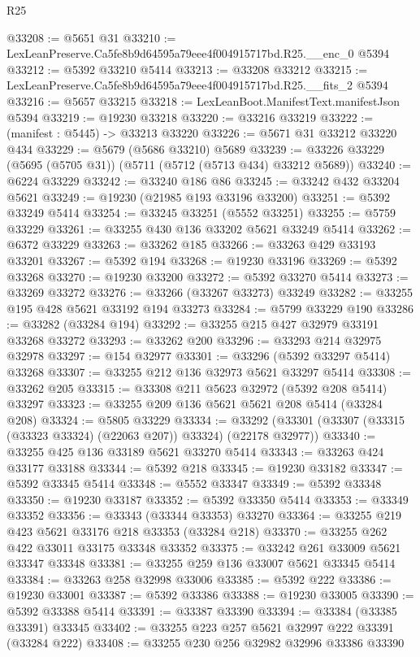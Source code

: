 \begin{lexlean}{R25}
\begin{coremodule}
@33208 := @5651 @31
@33210 := LexLeanPreserve.Ca5fe8b9d64595a79eee4f004915717bd.R25.__enc_0 @5394
@33212 := @5392 @33210 @5414
@33213 := @33208 @33212
@33215 := LexLeanPreserve.Ca5fe8b9d64595a79eee4f004915717bd.R25.__fits_2 @5394
@33216 := @5657 @33215
@33218 := LexLeanBoot.ManifestText.manifestJson @5394
@33219 := @19230 @33218
@33220 := @33216 @33219
@33222 := (manifest : @5445) -> @33213 @33220
@33226 := @5671 @31 @33212 @33220 @434
@33229 := @5679 (@5686 @33210) @5689
@33239 := @33226 @33229 (@5695 (@5705 @31)) (@5711 (@5712 (@5713 @434) @33212 @5689))
@33240 := @6224 @33229
@33242 := @33240 @186 @86
@33245 := @33242 @432 @33204 @5621
@33249 := @19230 (@21985 @193 @33196 @33200)
@33251 := @5392 @33249 @5414
@33254 := @33245 @33251 (@5552 @33251)
@33255 := @5759 @33229
@33261 := @33255 @430 @136 @33202 @5621 @33249 @5414
@33262 := @6372 @33229
@33263 := @33262 @185
@33266 := @33263 @429 @33193 @33201
@33267 := @5392 @194
@33268 := @19230 @33196
@33269 := @5392 @33268
@33270 := @19230 @33200
@33272 := @5392 @33270 @5414
@33273 := @33269 @33272
@33276 := @33266 (@33267 @33273) @33249
@33282 := @33255 @195 @428 @5621 @33192 @194 @33273
@33284 := @5799 @33229 @190
@33286 := @33282 (@33284 @194)
@33292 := @33255 @215 @427 @32979 @33191 @33268 @33272
@33293 := @33262 @200
@33296 := @33293 @214 @32975 @32978
@33297 := @154 @32977
@33301 := @33296 (@5392 @33297 @5414) @33268
@33307 := @33255 @212 @136 @32973 @5621 @33297 @5414
@33308 := @33262 @205
@33315 := @33308 @211 @5623 @32972 (@5392 @208 @5414) @33297
@33323 := @33255 @209 @136 @5621 @5621 @208 @5414 (@33284 @208)
@33324 := @5805 @33229
@33334 := @33292 (@33301 (@33307 (@33315 (@33323 @33324) (@22063 @207)) @33324) (@22178 @32977))
@33340 := @33255 @425 @136 @33189 @5621 @33270 @5414
@33343 := @33263 @424 @33177 @33188
@33344 := @5392 @218
@33345 := @19230 @33182
@33347 := @5392 @33345 @5414
@33348 := @5552 @33347
@33349 := @5392 @33348
@33350 := @19230 @33187
@33352 := @5392 @33350 @5414
@33353 := @33349 @33352
@33356 := @33343 (@33344 @33353) @33270
@33364 := @33255 @219 @423 @5621 @33176 @218 @33353 (@33284 @218)
@33370 := @33255 @262 @422 @33011 @33175 @33348 @33352
@33375 := @33242 @261 @33009 @5621 @33347 @33348
@33381 := @33255 @259 @136 @33007 @5621 @33345 @5414
@33384 := @33263 @258 @32998 @33006
@33385 := @5392 @222
@33386 := @19230 @33001
@33387 := @5392 @33386
@33388 := @19230 @33005
@33390 := @5392 @33388 @5414
@33391 := @33387 @33390
@33394 := @33384 (@33385 @33391) @33345
@33402 := @33255 @223 @257 @5621 @32997 @222 @33391 (@33284 @222)
@33408 := @33255 @230 @256 @32982 @32996 @33386 @33390

\end{coremodule}
\end{lexlean}
